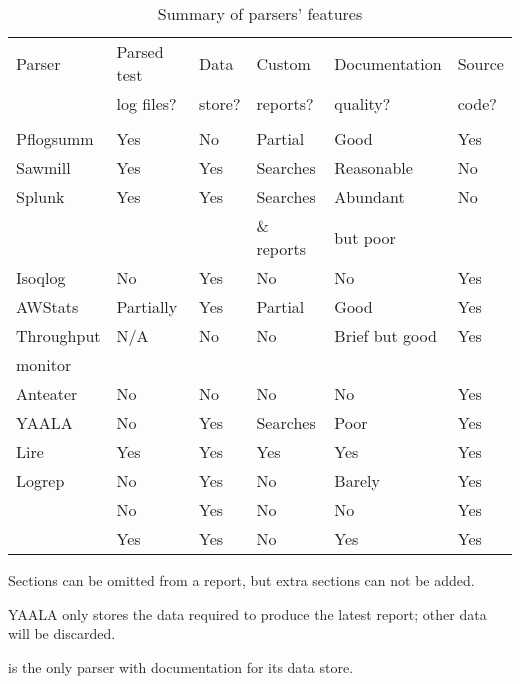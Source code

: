 \begin{table}[ht]
\begin{tabular}{l|l|l|l|l|l}
    Parser         & Parsed test & Data            & Custom        & Documentation  & Source \\
                   & log files?  & store?          & reports?      & quality?       & code?  \\
    \hline         &             &                 &               &                &        \\
    Pflogsumm      & Yes         & No              & Partial\dag{} & Good           & Yes    \\
    Sawmill        & Yes         & Yes             & Searches      & Reasonable     & No     \\
    Splunk         & Yes         & Yes             & Searches      & Abundant       & No     \\
                   &             &                 & \& reports    & but poor       &        \\
    Isoqlog        & No          & Yes             & No            & No             & Yes    \\
    AWStats        & Partially   & Yes             & Partial\dag{} & Good           & Yes    \\
    Throughput     & N/A         & No              & No            & Brief but good & Yes    \\
    \tab{}monitor  &             &                 &               &                &        \\
    Anteater       & No          & No              & No            & No             & Yes    \\
    YAALA          & No          & Yes\ddag{}      & Searches      & Poor           & Yes    \\
    Lire           & Yes         & Yes             & Yes           & Yes            & Yes    \\
    Logrep         & No          & Yes             & No            & Barely         & Yes    \\
    \LMA{}         & No          & Yes             & No            & No             & Yes    \\ 
    \parsername{}  & Yes         & Yes\dag{}\dag{} & No            & Yes            & Yes    \\
\end{tabular}

\dag{} Sections can be omitted from a report, but extra sections can not be
added.

\ddag{} YAALA only stores the data required to produce the latest report;
other data will be discarded.

\dag{}\dag{}\parsername{} is the only parser with documentation for its
data store.

\caption{Summary of parsers' features}
\label{Summary of parsers' features}
\end{table}


